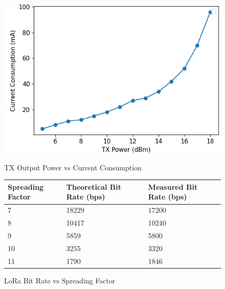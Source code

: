\begin{figure}[!htb]
  \begin{minipage}{.49\textwidth}
    \centering
    \includegraphics[width=0.95\linewidth]{txPower}
    \caption{TX Output Power vs Current Consumption}
    \label{fig:txPower}
  \end{minipage}
  \begin{minipage}{.49\textwidth}
      \centering
      \renewcommand{\arraystretch}{1.2}
      \begin{tabular}{ |p{2cm}|p{2.5cm}|p{2.5cm}| }
        \hline
        \textbf{Spreading Factor}        & \textbf{Theoretical Bit Rate (bps)}      & \textbf{Measured Bit Rate (bps)}    \\
        \hline
        7         & 18229         & 17200       \\  \hline
        8         & 10417         & 10240       \\  \hline
        9         & 5859          & 5800        \\  \hline
        10        & 3255          & 3320        \\  \hline
        11        & 1790          & 1846        \\  \hline
      \end{tabular}
      \caption{LoRa Bit Rate vs Spreading Factor}
      \label{tab:loraBitRate}
  \end{minipage}
  
\end{figure}
